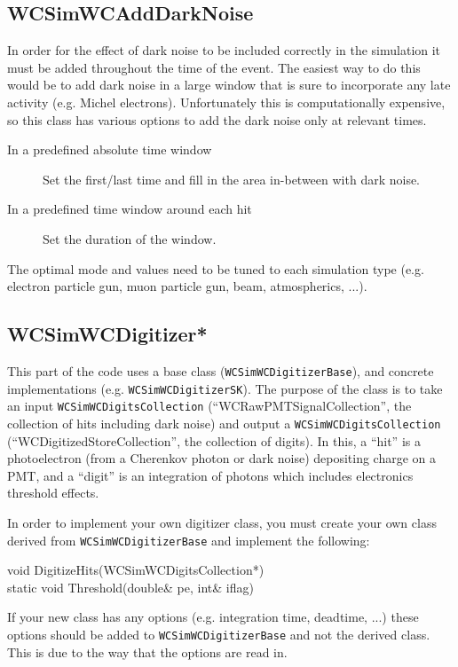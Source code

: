 \subsection{WCSimWCAddDarkNoise}
\label{sec:daq:darknoise}

In order for the effect of dark noise to be included correctly in the simulation it must be added throughout the time of the event. The easiest way to do this would be to add dark noise in a large window that is sure to incorporate any late activity (e.g. Michel electrons). Unfortunately this is computationally expensive, so this class has various options to add the dark noise only at relevant times.
\begin{description}
\item[In a predefined absolute time window] Set the first/last time and fill in the area in-between with dark noise.
\item[In a predefined time window around each hit] Set the duration of the window.
\end{description}
The optimal mode and values need to be tuned to each simulation type (e.g. electron particle gun, muon particle gun, beam, atmospherics, ...).

\subsection{WCSimWCDigitizer*}
\label{sec:daq:digitizer}

This part of the code uses a base class (\texttt{WCSimWCDigitizerBase}), and concrete implementations (e.g. \texttt{WCSimWCDigitizerSK}). The purpose of the class is to take an input \texttt{WCSimWCDigitsCollection} (``WCRawPMTSignalCollection'', the collection of hits including dark noise) and output a \texttt{WCSimWCDigitsCollection} (``WCDigitizedStoreCollection'', the collection of digits). In this, a ``hit'' is a photoelectron (from a Cherenkov photon or dark noise) depositing charge on a PMT, and  a ``digit'' is an integration of photons which includes electronics threshold effects.

In order to implement your own digitizer class, you must create your own class derived from \texttt{WCSimWCDigitizerBase} and implement the following:
\begin{description}
\item[void DigitizeHits(WCSimWCDigitsCollection*)] 
\item[static void Threshold(double\& pe, int\& iflag)] 
\end{description}
If your new class has any options (e.g. integration time, deadtime, ...) these options should be added to \texttt{WCSimWCDigitizerBase} and not the derived class. This is due to the way that the options are read in.

